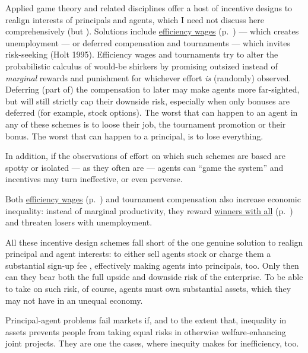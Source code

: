 Applied game theory and related disciplines offer a host of incentive designs to realign interests of principals and agents, which I need not discuss here comprehensively (but \citealt{Tirole2006}). Solutions include \hyperref[sec:efficiencywages]{efficiency wages} (p.~\pageref{sec:efficiencywages}) --- which creates unemployment --- or deferred compensation and tournaments --- which invites risk-seeking (Holt 1995). Efficiency wages and tournaments try to alter the probabilistic calculus of would-be shirkers by promising outsized instead of \emph{marginal} rewards and punishment for whichever effort \emph{is} (randomly) observed. Deferring (part of) the compensation to later may make agents more far-sighted, but will still strictly cap their downside risk, especially when only bonuses are deferred (for example, stock options). The worst that can happen to an agent in any of these schemes is to loose their job, the tournament promotion or their bonus. The worst that can happen to a principal, is to lose everything.

In addition, if the observations of effort on which such schemes are based are spotty or isolated --- as they often are --- agents can ``game the system'' and incentives may turn ineffective, or even perverse.

Both \hyperref[sec:efficiencywages]{efficiency wages} (p.~\pageref{sec:efficiencywages}) and tournament compensation also increase economic inequality: instead of marginal productivity, they reward \hyperref[sec:winner-take-all]{winners with all} (p.~\pageref{sec:winner-take-all}) and threaten losers with unemployment.

All these incentive design schemes fall short of the one genuine solution to realign principal and agent interests: to either sell agents stock or charge them a substantial sign-up fee \citep{Tirole2006}, effectively making agents into principals, too. Only then can they bear both the full upside and downside risk of the enterprise. To be able to take on such risk, of course, agents must own substantial assets, which they may not have in an unequal economy.

Principal-agent problems fail markets if, and to the extent that, inequality in assets prevents people from taking equal risks in otherwise welfare-enhancing joint projects. They are one the cases, where inequity makes for inefficiency, too. %

